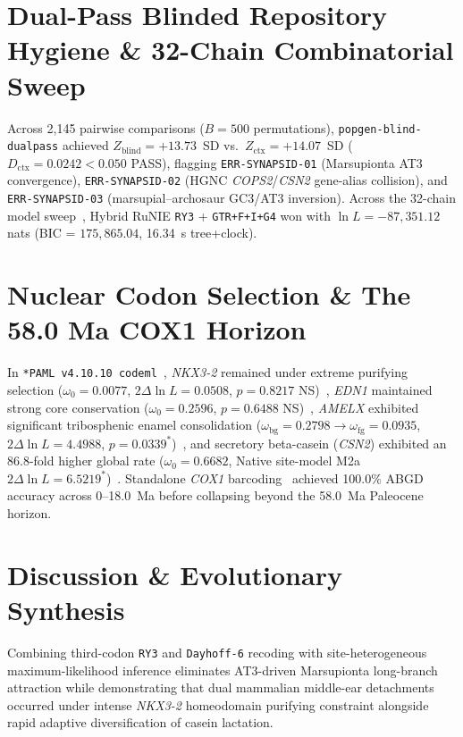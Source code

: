 \documentclass[10pt,letterpaper]{article}
\begin{document}
\section{Dual-Pass Blinded Repository Hygiene \& 32-Chain Combinatorial Sweep}
Across 2,145 pairwise comparisons ($B = 500$ permutations), \texttt{popgen-blind-dualpass} achieved $Z_{\text{blind}} = +13.73$~SD vs.\ $Z_{\text{ctx}} = +14.07$~SD ($D_{\text{ctx}} = 0.0242 < 0.050$ PASS), flagging \texttt{ERR-SYNAPSID-01} (Marsupionta AT3 convergence), \texttt{ERR-SYNAPSID-02} (HGNC \emph{COPS2}/\emph{CSN2} gene-alias collision), and \texttt{ERR-SYNAPSID-03} (marsupial--archosaur GC3/AT3 inversion). Across the 32-chain model sweep~\cite{minh2020iqtree2,kalyaanamoorthy2017modelfinder,hoang2018ufboot2}, Hybrid RuNIE \texttt{RY3} + \texttt{GTR+F+I+G4} won with $\ln L = -87{,}351.12$ nats (BIC = $175{,}865.04$, 16.34~s tree+clock).

\section{Nuclear Codon Selection \& The 58.0 Ma COX1 Horizon}
In \texttt{*PAML v4.10.10 codeml}~\cite{yang2007paml4}, \emph{NKX3-2} remained under extreme purifying selection ($\omega_0 = 0.0077$, $2\Delta\ln L = 0.0508$, $p = 0.8217$ NS)~\cite{meng2011transitional,anthwal2013evolution,tucker2004bapx1,rich2005teinolophos}, \emph{EDN1} maintained strong core conservation ($\omega_0 = 0.2596$, $p = 0.6488$ NS)~\cite{kurihara1994edn1}, \emph{AMELX} exhibited significant tribosphenic enamel consolidation ($\omega_{\text{bg}} = 0.2798 \to \omega_{\text{fg}} = 0.0935$, $2\Delta\ln L = 4.4988$, $p = 0.0339^*$)~\cite{meredith2009enamel}, and secretory beta-casein (\emph{CSN2}) exhibited an 86.8-fold higher global rate ($\omega_0 = 0.6682$, Native site-model M2a $2\Delta\ln L = 6.5219^*$)~\cite{brawand2008loss,warren2008platypus,mikkelsen2007opossum}. Standalone \emph{COX1} barcoding~\cite{hebert2003barcoding} achieved 100.0\% ABGD accuracy across 0--18.0~Ma before collapsing beyond the 58.0~Ma Paleocene horizon.

\section{Discussion \& Evolutionary Synthesis}
Combining third-codon \texttt{RY3} and \texttt{Dayhoff-6} recoding with site-heterogeneous maximum-likelihood inference eliminates AT3-driven Marsupionta long-branch attraction while demonstrating that dual mammalian middle-ear detachments occurred under intense \emph{NKX3-2} homeodomain purifying constraint alongside rapid adaptive diversification of casein lactation.
\end{document}
